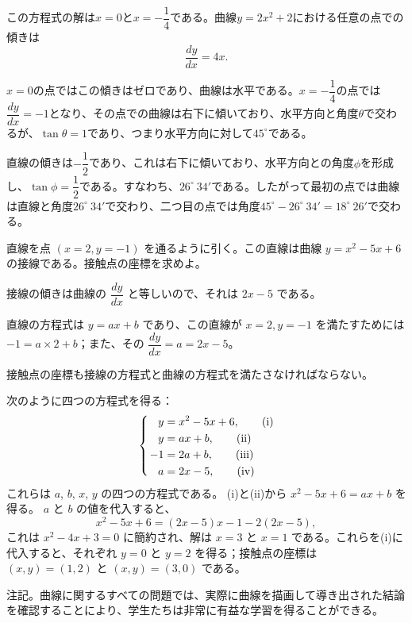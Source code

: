 \documentclass[a4paper,11pt,openany]{ltjsbook}
\begin{document}
この方程式の解は$x = 0$と$x = -\dfrac{1}{4}$である。曲線$y = 2x^2 + 2$における任意の点での傾きは
\[
\dfrac{dy}{dx} = 4x.
\]

$x = 0$の点ではこの傾きはゼロであり、曲線は水平である。$x = -\dfrac{1}{4}$の点では$\dfrac{dy}{dx} = -1$となり、その点での曲線は右下に傾いており、水平方向と角度$\theta$で交わるが、$\tan \theta = 1$であり、つまり水平方向に対して$45^\circ$である。

直線の傾きは$-\dfrac{1}{2}$であり、これは右下に傾いており、水平方向との角度$\phi$を形成し、$\tan \phi = \dfrac{1}{2}$である。すなわち、$26^\circ~34'$である。したがって最初の点では曲線は直線と角度$26^\circ~34'$で交わり、二つ目の点では角度$45^\circ - 26^\circ~34' = 18^\circ~26'$で交わる。

直線を点 $(x = 2, y = -1)$ を通るように引く。この直線は曲線 $y = x^2 - 5x + 6$ の接線である。接触点の座標を求めよ。

接線の傾きは曲線の $\dfrac{dy}{dx}$ と等しいので、それは $2x - 5$ である。

直線の方程式は $y = ax + b$ であり、この直線が $x = 2, y = -1$ を満たすためには $-1 = a \times 2 + b$；また、その $\dfrac{dy}{dx} = a = 2x - 5$。

接触点の座標も接線の方程式と曲線の方程式を満たさなければならない。

次のように四つの方程式を得る：
\begin{align*}
  y &= x^2 - 5x + 6, \tag*{(i)}   \\
  y &= ax + b,       \tag*{(ii)}  \\[
-0.6\baselineskip]
\smash{\left\{\begin{aligned} & \\ & \\ & \\ & \\ \end{aligned} \right.} \phantom{-1} & \\[-1.5ex]
 -1 &= 2a + b,       \tag*{(iii)} \\
  a &= 2x - 5,       \tag*{(iv)}
\end{align*}
これらは $a$, $b$, $x$, $y$ の四つの方程式である。
(i)と(ii)から $x^2 - 5x + 6 = ax + b$ を得る。
$a$ と $b$ の値を代入すると、
\[
  x^2 - 5x + 6 = (2x - 5)x - 1 - 2(2x - 5),
\]
これは $x^2 - 4x + 3 = 0$ に簡約され、解は $x = 3$ と $x = 1$ である。これらを(i)に代入すると、それぞれ $y = 0$ と $y = 2$ を得る；接触点の座標は $(x, y) = (1, 2)$ と $(x, y) = (3, 0)$ である。

注記。曲線に関するすべての問題では、実際に曲線を描画して導き出された結論を確認することにより、学生たちは非常に有益な学習を得ることができる。
\end{document}
